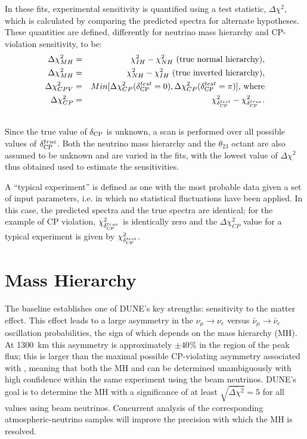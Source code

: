 In these fits, experimental sensitivity is quantified using a test
statistic, $\Delta\chi^2$, which is calculated by comparing the
predicted spectra for alternate hypotheses.  These quantities are
defined, differently for neutrino mass hierarchy and CP-violation
sensitivity, to be:
\begin{eqnarray}
\Delta\chi^2_{MH} & = & \chi^2_{IH} - \chi^2_{NH}\textrm{ (true normal hierarchy),}\label{eq:dx2_MH}\\ 
\Delta\chi^2_{MH} & = & \chi^2_{NH} - \chi^2_{IH}\textrm{ (true inverted hierarchy),}\\
\Delta\chi^2_{CPV} & = & Min[\Delta\chi^2_{CP}(\mdeltacp^{test}=0),\Delta\chi^2_{CP}(\mdeltacp^{test}=\pi)]\textrm{, where} \\
\Delta\chi^2_{CP} & = & \chi^2_{\mdeltacp^{test}} - \chi^2_{\mdeltacp^{true}}.\label{eq:dx2_CP} \\ \nonumber
\end{eqnarray}
Since the true value of $\mdeltacp$ is unknown, a scan is performed
over all possible values of $\mdeltacp^{true}$. Both the neutrino mass
hierarchy and the $\theta_{23}$ octant are also assumed to be unknown and
are varied in the fits, with the lowest value of $\Delta\chi^2$ thus
obtained used to estimate the sensitivities.

A ``typical
experiment'' is defined as one with the most probable data given a set of input
parameters, i.e. in which no statistical fluctuations have been
applied. 
 In this case, the predicted spectra and the true spectra are
identical; for the example of CP violation,
$\chi^2_{\mdeltacp^{true}}$ is identically zero and the
$\Delta\chi^2_{CP}$ value for a typical experiment is given by
$\chi^2_{\mdeltacp^{test}}$.

\section{Mass Hierarchy}
\label{sec:physics-lbnosc-mh}

The  baseline establishes one of DUNE's key strengths:
sensitivity to the matter effect. This effect leads to a large
asymmetry in the $\nu_\mu\to \nu_e$ versus $\bar{\nu}_\mu \to
\bar{\nu}_e$ oscillation probabilities, the sign of which depends
on the mass hierarchy (MH).  At 1300~km this asymmetry is
approximately $\pm 40\%$ in the region of the peak flux; this is
larger than the maximal possible CP-violating asymmetry associated
with \deltacp, meaning that both the MH and \deltacp can be determined
unambiguously with high confidence within the same experiment using
the beam neutrinos.  DUNE's goal is to determine the MH with a
significance of at least $\sqrt{\overline{\Delta\chi^{2}}} = 5$ for
all \deltacp values using beam neutrinos.  Concurrent analysis of the
corresponding atmospheric-neutrino samples will improve the precision
with which the MH is resolved.

